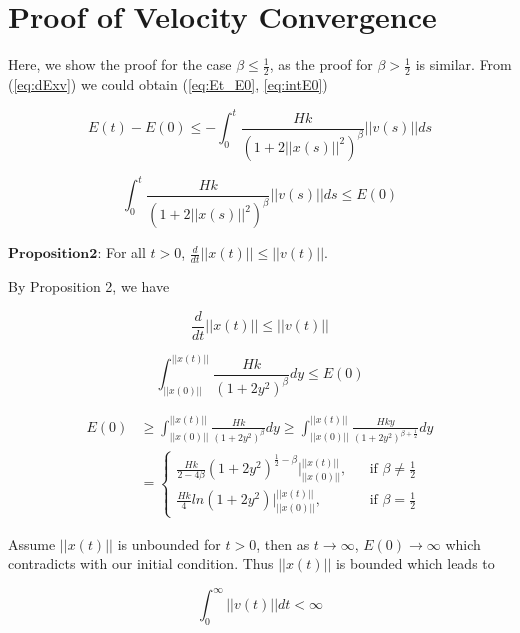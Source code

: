 \section{Proof of Velocity Convergence}

Here, we show the proof for the case $\beta\leq\frac{1}{2}$, as the proof for $\beta>\frac{1}{2}$ is similar. From (\ref{eq:dExv}) we could obtain (\ref{eq:Et_E0}, \ref{eq:intE0})

\begin{equation}\label{eq:Et_E0}
E(t)-E(0)\leq-\int_0^t\frac{Hk}{(1+2||x(s)||^2)^{\beta}}||v(s)||ds
\end{equation}

\begin{equation}\label{eq:intE0}
\int_0^t\frac{Hk}{(1+2||x(s)||^2)^{\beta}}||v(s)||ds\leq E(0)
\end{equation}

$\mathbf{Proposition 2}$: For all $t>0$, $\frac{d}{dt}||x(t)||\leq||v(t)||$.

By Proposition 2, we have

\begin{equation}\label{eq:proposition2}
\frac{d}{dt}||x(t)||\leq||v(t)||
\end{equation}

\begin{equation}
\int_{||x(0)||}^{||x(t)||}\frac{Hk}{(1+2y^2)^{\beta}}dy\leq E(0)
\end{equation}

\begin{equation}
\begin{aligned}
E(0)&\geq\int_{||x(0)||}^{||x(t)||}\frac{Hk}{(1+2y^2)^{\beta}}dy\geq\int_{||x(0)||}^{||x(t)||}\frac{Hky}{(1+2y^2)^{\beta+\frac{1}{2}}}dy\\
&=\left\{\begin{array}{rcl}\frac{Hk}{2-4\beta}(1+2y^2)^{\frac{1}{2}-\beta}|^{||x(t)||}_{||x(0)||}, & & \text{if $\beta\neq\frac{1}{2}$}\\\frac{Hk}{4}ln(1+2y^2)|^{||x(t)||}_{||x(0)||}, & & \text{if $\beta=\frac{1}{2}$}\end{array} \right.
\end{aligned}
\end{equation}

\noindent
Assume $||x(t)||$ is unbounded for $t>0$, then as $t\to\infty$, $E(0)\to\infty$ which contradicts with our initial condition. Thus $||x(t)||$ is bounded which leads to

\begin{equation}\label{eq:boundv}
\int_0^{\infty}||v(t)||dt<\infty
\end{equation}

